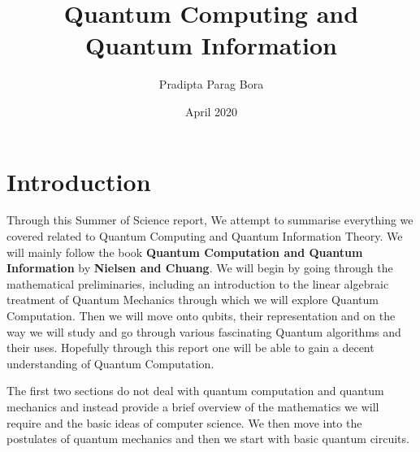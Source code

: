 \documentclass{article}
\title{Quantum Computing and Quantum Information }
\author{Pradipta Parag Bora}
\date{April 2020}
\numberwithin{equation}{section}
\theoremstyle{definition}
\numberwithin{definition}{section}
\numberwithin{theorem}{section}
\theoremstyle{remark}
\numberwithin{exercise}{section}
\begin{document}
\maketitle

\tableofcontents

\section{Introduction}
Through this Summer of Science report, We attempt to summarise everything we covered related to Quantum Computing and Quantum Information Theory. We will mainly follow the book \textbf{Quantum Computation and Quantum Information} by \textbf{Nielsen and Chuang}. We will begin by going through the mathematical preliminaries, including an introduction to the linear algebraic treatment of Quantum Mechanics through which we will explore Quantum Computation. Then we will move onto qubits, their representation and on the way we will study and go through various fascinating Quantum algorithms and their uses. Hopefully through this report one will be able to gain a decent understanding of Quantum Computation. 

The first two sections do not deal with quantum computation and quantum mechanics and instead provide a brief overview of the mathematics we will require and the basic ideas of computer science. We then move into the postulates of quantum mechanics and then we start with basic quantum circuits.


\end{document}
